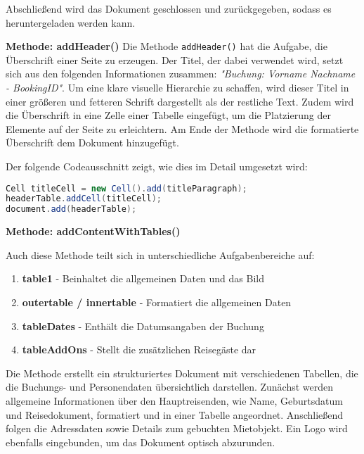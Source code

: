 	\vspace{3mm}
	\noindent Abschließend wird das Dokument geschlossen und zurückgegeben, sodass es heruntergeladen werden kann.
	
	
	
	\newpage
	\noindent \textbf{Methode: addHeader()}\vspace{3mm}\newline
	\noindent Die Methode \texttt{addHeader()} hat die Aufgabe, die Überschrift einer Seite zu erzeugen. Der Titel, der dabei verwendet wird, setzt sich aus den folgenden Informationen zusammen: \textit{"Buchung: Vorname Nachname - BookingID"}. Um eine klare visuelle Hierarchie zu schaffen, wird dieser Titel in einer größeren und fetteren Schrift dargestellt als der restliche Text. Zudem wird die Überschrift in eine Zelle einer Tabelle eingefügt, um die Platzierung der Elemente auf der Seite zu erleichtern. Am Ende der Methode wird die formatierte Überschrift dem Dokument hinzugefügt.
	
	\vspace{3mm}
	\noindent Der folgende Codeausschnitt zeigt, wie dies im Detail umgesetzt wird:
	
\begin{lstlisting}[language=Java, caption={Code-Ausschnitt: Header erstellen.}]
Cell titleCell = new Cell().add(titleParagraph);
headerTable.addCell(titleCell);
document.add(headerTable);
\end{lstlisting}

	\vspace{5mm}
	\noindent \textbf{Methode: addContentWithTables()}\vspace{3mm}
	
	\noindent Auch diese Methode teilt sich in unterschiedliche Aufgabenbereiche auf:
	
	\begin{enumerate}
		\item \textbf{table1} - Beinhaltet die allgemeinen Daten und das Bild
		\item \textbf{outertable / innertable} - Formatiert die allgemeinen Daten
		\item \textbf{tableDates} - Enthält die Datumsangaben der Buchung
		\item \textbf{tableAddOns} - Stellt die zusätzlichen Reisegäste dar
	\end{enumerate}
	
	\vspace{3mm} 
	
	\noindent Die Methode erstellt ein strukturiertes Dokument mit verschiedenen Tabellen, die die Buchungs- und Personendaten übersichtlich darstellen. Zunächst werden allgemeine Informationen über den Hauptreisenden, wie Name, Geburtsdatum und Reisedokument, formatiert und in einer Tabelle angeordnet. Anschließend folgen die Adressdaten sowie Details zum gebuchten Mietobjekt.  Ein Logo wird ebenfalls eingebunden, um das Dokument optisch abzurunden.  
	
